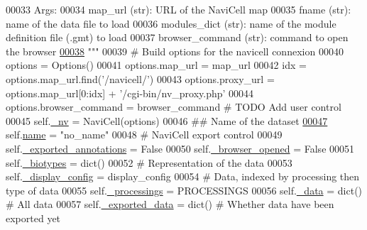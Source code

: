 \begin{DoxyCode}
00033 \textcolor{stringliteral}{        Args:}
00034 \textcolor{stringliteral}{            map\_url (str): URL of the NaviCell map}
00035 \textcolor{stringliteral}{            fname (str): name of the data file to load}
00036 \textcolor{stringliteral}{            modules\_dict (str): name of the module definition file (.gmt) to load
      }
00037 \textcolor{stringliteral}{            browser\_command (str): command to open the browser}
\hypertarget{navicom_8py_source_l00038}{}\hyperlink{classnavicom_1_1navicom_1_1NaviCom_ae6133fe7ec63cf5643c1794f4f8e2349}{00038} \textcolor{stringliteral}{        """}
00039         \textcolor{comment}{# Build options for the navicell connexion}
00040         options = Options()
00041         options.map\_url = map\_url
00042         idx = options.map\_url.find(\textcolor{stringliteral}{'/navicell/'})
00043         options.proxy\_url = options.map\_url[0:idx] + \textcolor{stringliteral}{'/cgi-bin/nv\_proxy.php'}
00044         options.browser\_command = browser\_command \textcolor{comment}{# TODO Add user control}
00045         self.\hyperlink{classnavicom_1_1navicom_1_1NaviCom_afff3fd56fa16a68bab52ba8d801e325a}{_nv} = NaviCell(options)
00046         \textcolor{comment}{## Name of the dataset}
\hypertarget{navicom_8py_source_l00047}{}\hyperlink{classnavicom_1_1navicom_1_1NaviCom_a950e5ebf199edea40d55c506b8aaf134}{00047}         self.\hyperlink{classnavicom_1_1navicom_1_1NaviCom_a950e5ebf199edea40d55c506b8aaf134}{name} = \textcolor{stringliteral}{"no\_name"} 
00048         \textcolor{comment}{# NaviCell export control}
00049         self.\hyperlink{classnavicom_1_1navicom_1_1NaviCom_a3f78f9d3f194b32b14f1cfa154a26082}{_exported_annotations} = \textcolor{keyword}{False}
00050         self.\hyperlink{classnavicom_1_1navicom_1_1NaviCom_a6f40767575f6ae749bd9275d462f1af2}{_browser_opened} = \textcolor{keyword}{False}
00051         self.\hyperlink{classnavicom_1_1navicom_1_1NaviCom_a53870501f47d416a35c6c743d3d222d2}{_biotypes} = dict()
00052         \textcolor{comment}{# Representation of the data}
00053         self.\hyperlink{classnavicom_1_1navicom_1_1NaviCom_ab8ddca454f674629472d8bfec46ac76f}{_display_config} = display\_config
00054         \textcolor{comment}{# Data, indexed by processing then type of data}
00055         self.\hyperlink{classnavicom_1_1navicom_1_1NaviCom_ac6a14d6a91cd2f236eef71496a6f249c}{_processings} = PROCESSINGS
00056         self.\hyperlink{classnavicom_1_1navicom_1_1NaviCom_a407b2b5c30a5652ee85c4be54b3e6679}{_data} = dict() \textcolor{comment}{# All data}
00057         self.\hyperlink{classnavicom_1_1navicom_1_1NaviCom_ab7328fbbe89a1b3cb2db8c3d456d958f}{_exported_data} = dict() \textcolor{comment}{# Whether data have been exported yet}

\end{DoxyCode}
